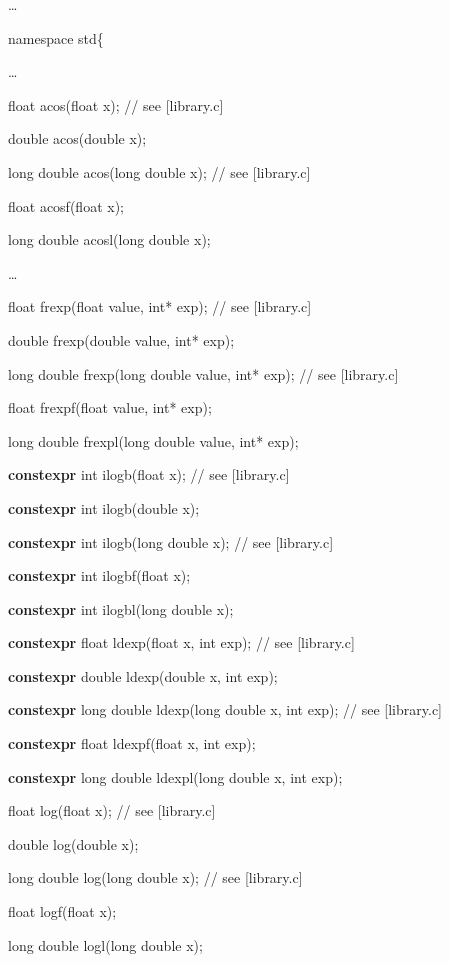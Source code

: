 \documentclass[prd,preprint,amsmath,amssymb,nofootinbib,eqsecnum]{revtex4-1}
\newcommand{\code}[1]{{\tt #1}}
\newcommand{\highlight}[1]{{\bf #1}}
\begin{document}
\code{

\ldots

namespace std\{

\ldots

float acos(float x); // see [library.c]

double acos(double x);

long double acos(long double x); // see [library.c]

float acosf(float x);

long double acosl(long double x);

\ldots

float frexp(float value, int* exp); // see [library.c]

double frexp(double value, int* exp);

long double frexp(long double value, int* exp); // see [library.c]

float frexpf(float value, int* exp);

long double frexpl(long double value, int* exp);

\vspace{2ex}

\highlight{constexpr} int ilogb(float x); // see [library.c]

\highlight{constexpr} int ilogb(double x);

\highlight{constexpr} int ilogb(long double x); // see [library.c]

\highlight{constexpr} int ilogbf(float x);

\highlight{constexpr} int ilogbl(long double x);

\vspace{2ex}

\highlight{constexpr} float ldexp(float x, int exp); // see [library.c]

\highlight{constexpr} double ldexp(double x, int exp);

\highlight{constexpr} long double ldexp(long double x, int exp); // see [library.c]

\highlight{constexpr} float ldexpf(float x, int exp);

\highlight{constexpr} long double ldexpl(long double x, int exp);

float log(float x); // see [library.c]

double log(double x);

long double log(long double x); // see [library.c]

float logf(float x);

long double logl(long double x);

}
\end{document}
